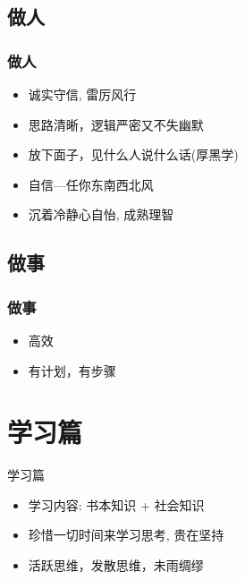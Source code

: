\subsection{做人}
\begin{frame}
\frametitle{做人}
\begin{itemize}
    \item 诚实守信, 雷厉风行
    \item 思路清晰，逻辑严密又不失幽默
    \item 放下面子，见什么人说什么话(厚黑学)
    \item 自信—任你东南西北风
    \item 沉着冷静心自怡, 成熟理智
\end{itemize}
\end{frame}

\subsection{做事}
\begin{frame}
\frametitle{做事}
\begin{itemize}
    \item 高效
    \item 有计划，有步骤
\end{itemize}
\end{frame}

\section{学习篇}
\begin{frame}{学习篇}
\begin{itemize}
    \item 学习内容: 书本知识 + 社会知识
    \item 珍惜一切时间来学习思考, 贵在坚持
    \item 活跃思维，发散思维，未雨绸缪
\end{itemize}
\end{frame}

